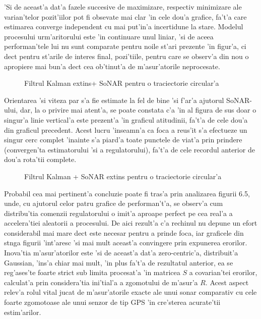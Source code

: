 \documentclass[12pt,a4paper,twoside]{report}
\begin{document}
\vspace{5px}

'Si de aceast'a dat'a fazele succesive de maximizare, respectiv minimizare ale varian'telor pozit'iilor pot fi obsevate mai clar 'in cele dou'a grafice, fa't'a care estimarea converge independent cu mai put'in'a incertidune la stare. Modelul procesului urm'aritorului este 'in continuare unul liniar, 'si de aceea performan'tele lui nu sunt comparate pentru noile st'ari prezente 'in figur'a, ci dec\ia t pentru st'arile de interes final, pozi'tiile, pentru care se observ'a din nou o apropiere mai bun'a dec\ia t cea ob'tinut'a de m'asur'atorile neprocesate. 


\begin{figure}[h]
\hspace*{-5cm}
 
 \caption{Filtrul Kalman extins+ SoNAR pentru o traciectorie circular'a
 }
\end{figure}

Orientarea 'si viteza par s'a fie estimate la fel de bine 'si f'ar'a ajutorul SoNAR-ului, dar, la o privire mai atent'a, se poate constata c'a 'in al figura de sus doar o singur'a linie vertical'a este prezent'a 'in graficul atitudinii, fa't'a de cele dou'a din graficul precedent. Acest lucru 'inseamn'a ca foca a reus'it s'a efectueze un singur cerc complet 'inainte s'a piard'a toate punctele de viat'a prin prindere (convergen'ta estimatorului 'si a regulatorului), fa't'a de cele recordul anterior de dou'a rota'tii complete.

\begin{figure}[h]
\hspace*{-5cm}
 
 \caption{Filtrul Kalman + SoNAR extins pentru o traciectorie circular'a
 }
\end{figure}

Probabil cea mai pertinent'a concluzie poate fi tras'a prin analizarea figurii 6.5, unde, cu ajutorul celor patru grafice de performan't'a, se observ'a cum distribu'tia comenzii regulatorului o imit'a aproape perfect pe cea real'a a accelera'tiei aleatorii a procesului. De aici rezult'a c'a rechinul nu depune un efort considerabil mai mare dec\ia t este necesar pentru a prinde foca, iar graficele din st\ia nga figurii 'int'aresc 'si mai mult aceast'a convingere prin expunerea erorilor. Inova'tia m'asur'atorilor este 'si de aceast'a dat'a zero-centric'a, distribuit'a Gaussian, 'ins'a chiar mai mult, 'in plus fa't'a de rezultatul anterior, ea se reg'ases'te foarte strict sub limita procesat'a 'in matricea $S$ a covarian'tei erorilor, calculat'a prin considera'tia ini'tial'a a zgomotului de m'asur'a $R$. Acest aspect relev'a rolul vital jucat de m'asur'atorile exacte ale unui sonar comparativ cu cele foarte zgomotoase ale unui senzor de tip GPS 'in cre'sterea acurate'tii estim'arilor.
\end{document}
